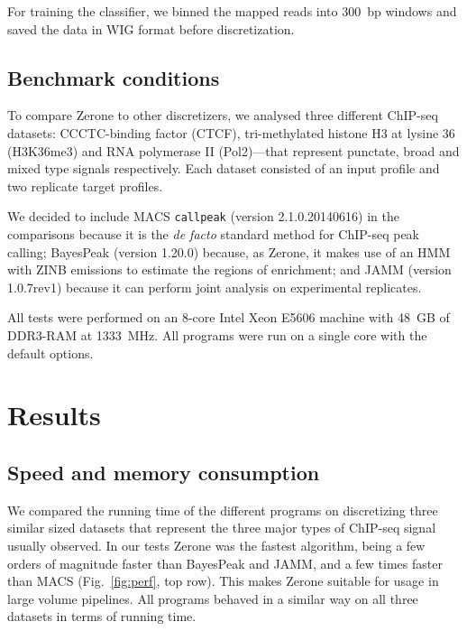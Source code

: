 \documentclass{bioinfo}
\begin{document}
\begin{methods}
For training the classifier, we binned the mapped reads into 300~bp
windows and saved the data in WIG format before discretization.



\subsection{Benchmark conditions}
To compare Zerone to other discretizers, we analysed three different
ChIP-seq datasets: CCCTC-binding factor (CTCF), tri-methylated histone H3 at
lysine 36 (H3K36me3) and RNA polymerase II (Pol2)---that represent punctate,
broad and mixed type signals respectively. Each dataset consisted of an input
profile and two replicate target profiles.

We decided to include MACS \texttt{callpeak} (version 2.1.0.20140616) in
the comparisons because it is the \textit{de facto} standard method
for ChIP-seq peak calling; BayesPeak (version 1.20.0) because, as Zerone,
it makes use of an HMM with ZINB emissions to estimate the regions of
enrichment; and JAMM (version 1.0.7rev1) because it can perform joint
analysis on experimental replicates.

All tests were performed on an 8-core Intel Xeon E5606 machine with 48~GB of
DDR3-RAM at 1333~MHz. All programs were run on a single core with the default
options.

\end{methods}

\section{Results}
\label{sec:results}


\subsection{Speed and memory consumption}
We compared the running time of the different programs on discretizing three
similar sized datasets that represent the three major types of ChIP-seq signal
usually observed. In our tests Zerone was the fastest algorithm, being a few
orders of magnitude faster than BayesPeak and JAMM, and a few times faster than
MACS (Fig.~\ref{fig:perf}, top row). This makes Zerone suitable for usage in
large volume pipelines. All programs behaved in a similar way on all three
datasets in terms of running time.
\end{document}
